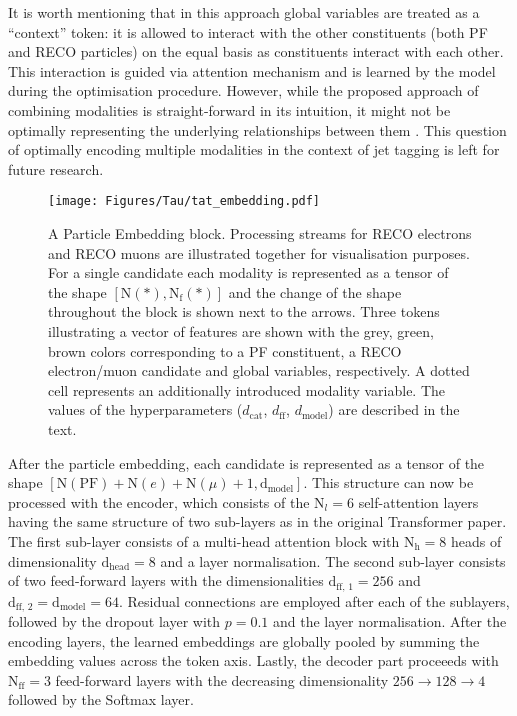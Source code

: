 It is worth mentioning that in this approach global variables are treated as a \enquote{context} token: it is allowed to interact with the other constituents (both PF and RECO particles) on the equal basis as constituents interact with each other. This interaction is guided via attention mechanism and is learned by the model during the optimisation procedure. However, while the proposed approach of combining modalities is straight-forward in its intuition, it might not be optimally representing the underlying relationships between them \cite{xu2022multimodal}. This question of optimally encoding multiple modalities in the context of jet tagging is left for future research.   

\begin{figure}[t!]
    \centering
    \texttt{[image: Figures/Tau/tat\_embedding.pdf]}
    \caption{A Particle Embedding block. Processing streams for RECO electrons and RECO muons are illustrated together for visualisation purposes. For a single \tauh candidate each modality is represented as a tensor of the shape $[\text{N}(*), \text{N}_\text{f}(*)]$ and the change of the shape throughout the block is shown next to the arrows. Three tokens illustrating a vector of features are shown with the grey, green, brown colors corresponding to a PF constituent, a RECO electron/muon candidate and global variables, respectively. A dotted cell represents an additionally introduced modality variable. The values of the hyperparameters ($d_\text{cat}$, $d_\text{ff}$, $d_\text{model}$) are described in the text.}
    \label{fig:tat_embedding}
\end{figure}

After the particle embedding, each \tauh candidate is represented as a tensor of the shape $[\text{N}(\text{PF})+\text{N}(e)+\text{N}(\mu)+1, \text{d}_\text{model}]$. This structure can now be processed with the encoder, which consists of the $\text{N}_l=6$ self-attention layers having the same structure of two sub-layers as in the original Transformer paper. The first sub-layer consists of a multi-head attention block with $\text{N}_\text{h}=8$ heads of dimensionality $\text{d}_\text{head}=8$ and a layer normalisation. The second sub-layer consists of two feed-forward layers with the dimensionalities $\text{d}_\text{ff, 1}=256$ and $\text{d}_\text{ff, 2}=\text{d}_\text{model}=64$. Residual connections are employed after each of the sublayers, followed by the dropout layer with $p=0.1$ and the layer normalisation. After the encoding layers, the learned embeddings are globally pooled by summing the embedding values across the token axis. Lastly, the decoder part proceeeds with $\text{N}_\text{ff}=3$ feed-forward layers with the decreasing dimensionality $256 \to 128 \to 4$ followed by the Softmax layer.   


